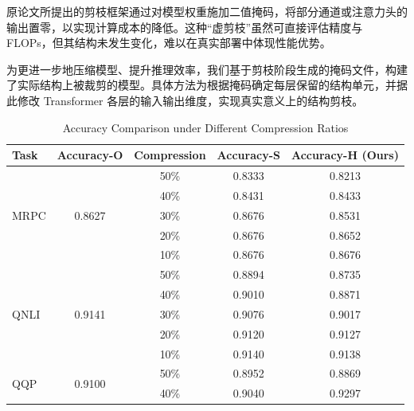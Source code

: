 \documentclass[UTF8,openany]{ctexbook}
\begin{document}
原论文所提出的剪枝框架通过对模型权重施加二值掩码，将部分通道或注意力头的输出置零，以实现计算成本的降低。这种“虚剪枝”虽然可直接评估精度与 FLOPs，但其结构未发生变化，难以在真实部署中体现性能优势。

为更进一步地压缩模型、提升推理效率，我们基于剪枝阶段生成的掩码文件，构建了实际结构上被裁剪的模型。具体方法为根据掩码确定每层保留的结构单元，并据此修改 Transformer 各层的输入输出维度，实现真实意义上的结构剪枝。

\begin{table}[htbp]
    \centering
    \caption{Accuracy Comparison under Different Compression Ratios}
    \label{fig:structural_vs_virtual_acc}
    \begin{tabular}{lcccc}
    \toprule
    Task & Accuracy-O & Compression & Accuracy-S & \textbf{Accuracy-H (Ours)} \\
    \midrule
    \multirow{5}{*}{MRPC} 
         & \multirow{5}{*}{0.8627} & 50\% & \cellcolor{lightgray}0.8333 & \cellcolor{darkgray}0.8213 \\ %
         &                         & 40\% & \cellcolor{lightgray}0.8431 & \cellcolor{darkgray}0.8433 \\ %
         &                         & 30\% & \cellcolor{lightgray}0.8676 & \cellcolor{darkgray}0.8531 \\ %
         &                         & 20\% & \cellcolor{lightgray}0.8676 & \cellcolor{darkgray}0.8652 \\
         &                         & 10\% & \cellcolor{lightgray}0.8676 & \cellcolor{darkgray}0.8676 \\
    \midrule
    \multirow{5}{*}{QNLI} 
         & \multirow{5}{*}{0.9141} & 50\% & \cellcolor{lightgray}0.8894 & \cellcolor{darkgray}0.8735 \\
         &                         & 40\% & \cellcolor{lightgray}0.9010 & \cellcolor{darkgray}0.8871 \\
         &                         & 30\% & \cellcolor{lightgray}0.9076 & \cellcolor{darkgray}0.9017 \\
         &                         & 20\% & \cellcolor{lightgray}0.9120 & \cellcolor{darkgray}0.9127 \\
         &                         & 10\% & \cellcolor{lightgray}0.9140 & \cellcolor{darkgray}0.9138 \\
    \midrule
    \multirow{5}{*}{QQP} 
         & \multirow{5}{*}{0.9100} & 50\% & \cellcolor{lightgray}0.8952 & \cellcolor{darkgray}0.8869 \\
         &                         & 40\% & \cellcolor{lightgray}0.9040 & \cellcolor{darkgray}0.9297 \\

\end{tabular}
\end{table}
\end{document}
